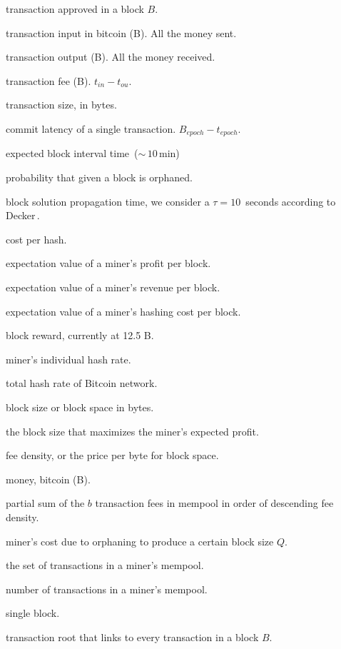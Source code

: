 \documentclass[USenglish]{uit-thesis}
\def\bitcoin{\leavevmode\rlap{\hskip.5pt-}B}
\begin{document}
\begin{appendices}
\begin{description}[leftmargin=!, labelwidth=\widthof{\bfseries $M_{demand}(b)$ }]
	\setlength\itemsep{1em}
	\item [$t_B$] transaction approved in a block $B$.
	\item [$t_{in}$] transaction input in bitcoin (\bitcoin). All the money sent.
	\item [$t_{ou}$] transaction output (\bitcoin). All the money received.
	\item [$t_{f}$] transaction fee (\bitcoin). $t_{in} - t_{ou}$.
	\item [$t_q$] transaction size, in bytes.
	\item [$t_l$] commit latency of a single transaction. $B_{epoch} - t_{epoch}$.
	\item [$\mathcal{T}$] expected block interval time~($\sim$\,$10$\,min)
	\item [$\mathbb{P}_{orphan}$] probability that given a block is orphaned.
	\item [$\tau$] block solution propagation time, we consider a $\tau = 10$\,
	seconds according to Decker\,\cite{Decker2013IPBN}.
	\item [$\eta$] cost per hash.
	\item [$\langle \Pi \rangle$] expectation value of a miner’s profit per block.
	\item [$\langle V\rangle$] expectation value of a miner’s revenue per block.
	\item [$\langle C\rangle$] expectation value of a miner's hashing cost per block.
	\item [$R$] block reward, currently at 12.5 \bitcoin.
	\item [$h$] miner's individual hash rate.
	\item [$H$] total hash rate of Bitcoin network.
	\item [$Q$] block size or block space in bytes.
	\item [$Q^*$] the block size that maximizes the miner’s expected profit.
	\item [$\rho$] fee density, or the price per byte for block space.
	\item [$M$] money, bitcoin (\bitcoin).
	\item [$M_{demand}(b)$] partial sum of the $b$ transaction fees
	in mempool in order of descending fee density.
	\item [$M_{supply}(Q)$] miner’s cost due to orphaning to produce a certain block size $Q$.
	\item [$\mathcal{N}$] the set of transactions in a miner’s mempool.
	\item [$n$] number of transactions in a miner’s mempool.
	\item [$B$] single block.
	\item [$B_t$] transaction root that links to every transaction in a block $B$.
\end{description}


\end{appendices}
\end{document}
